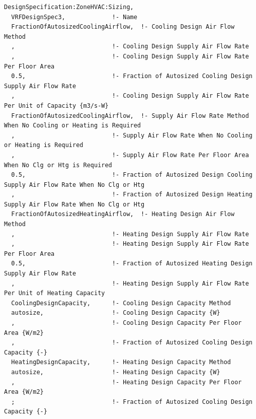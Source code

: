 \begin{lstlisting}
DesignSpecification:ZoneHVAC:Sizing,
  VRFDesignSpec3,             !- Name
  FractionOfAutosizedCoolingAirflow,  !- Cooling Design Air Flow Method
  ,                           !- Cooling Design Supply Air Flow Rate
  ,                           !- Cooling Design Supply Air Flow Rate Per Floor Area
  0.5,                        !- Fraction of Autosized Cooling Design Supply Air Flow Rate
  ,                           !- Cooling Design Supply Air Flow Rate Per Unit of Capacity {m3/s-W}
  FractionOfAutosizedCoolingAirflow,  !- Supply Air Flow Rate Method When No Cooling or Heating is Required
  ,                           !- Supply Air Flow Rate When No Cooling or Heating is Required
  ,                           !- Supply Air Flow Rate Per Floor Area When No Clg or Htg is Required
  0.5,                        !- Fraction of Autosized Design Cooling Supply Air Flow Rate When No Clg or Htg
  ,                           !- Fraction of Autosized Design Heating Supply Air Flow Rate When No Clg or Htg
  FractionOfAutosizedHeatingAirflow,  !- Heating Design Air Flow Method
  ,                           !- Heating Design Supply Air Flow Rate
  ,                           !- Heating Design Supply Air Flow Rate Per Floor Area
  0.5,                        !- Fraction of Autosized Heating Design Supply Air Flow Rate
  ,                           !- Heating Design Supply Air Flow Rate Per Unit of Heating Capacity
  CoolingDesignCapacity,      !- Cooling Design Capacity Method
  autosize,                   !- Cooling Design Capacity {W}
  ,                           !- Cooling Design Capacity Per Floor Area {W/m2}
  ,                           !- Fraction of Autosized Cooling Design Capacity {-}
  HeatingDesignCapacity,      !- Heating Design Capacity Method
  autosize,                   !- Heating Design Capacity {W}
  ,                           !- Heating Design Capacity Per Floor Area {W/m2}
  ;                           !- Fraction of Autosized Cooling Design Capacity {-}


\end{lstlisting}
